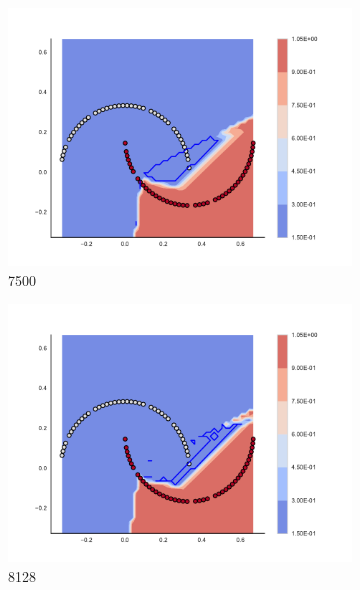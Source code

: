         \begin{figure}[h]\ContinuedFloat
        
\begin{subfigure}[b]{0.09\textwidth}
    \includegraphics[clip, trim=2.35cm 1.75cm 4.5cm 0cm,width=\textwidth]{img/convergence/7500.pdf}
    \caption{7500}
    \label{fig:convergence_7500}
\end{subfigure}
%
\begin{subfigure}[b]{0.09\textwidth}
    \includegraphics[clip, trim=2.35cm 1.75cm 4.5cm 0cm,width=\textwidth]{img/convergence/8128.pdf}
    \caption{8128}
    \label{fig:convergence_8128}
\end{subfigure}
%
\begin{subfigure}[b]{0.09\textwidth}

\end{subfigure}
\end{figure}
